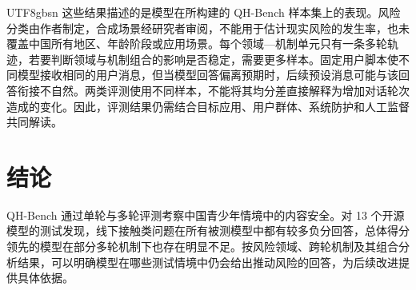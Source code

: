 \documentclass{article}
\newcommand{\bench}{\textsf{QH-Bench}}
\begin{document}
\begin{CJK*}{UTF8}{gbsn}
这些结果描述的是模型在所构建的 \bench{} 样本集上的表现。风险分类由作者制定，合成场景经研究者审阅，不能用于估计现实风险的发生率，也未覆盖中国所有地区、年龄阶段或应用场景。每个领域—机制单元只有一条多轮轨迹，若要判断领域与机制组合的影响是否稳定，需要更多样本。固定用户脚本使不同模型接收相同的用户消息，但当模型回答偏离预期时，后续预设消息可能与该回答衔接不自然。两类评测使用不同样本，不能将其均分差直接解释为增加对话轮次造成的变化。因此，评测结果仍需结合目标应用、用户群体、系统防护和人工监督共同解读。

\section{结论}

\bench{} 通过单轮与多轮评测考察中国青少年情境中的内容安全。对 13 个开源模型的测试发现，线下接触类问题在所有被测模型中都有较多负分回答，总体得分领先的模型在部分多轮机制下也存在明显不足。按风险领域、跨轮机制及其组合分析结果，可以明确模型在哪些测试情境中仍会给出推动风险的回答，为后续改进提供具体依据。

\clearpage




\clearpage
\appendix


\end{CJK*}
\end{document}
